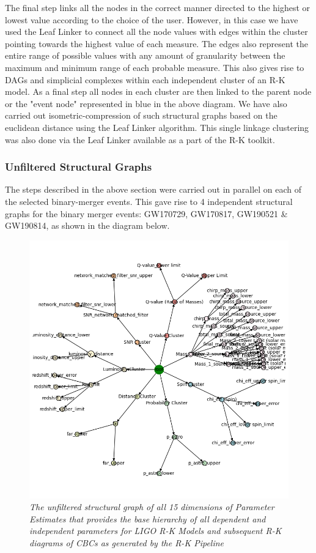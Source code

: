 The final step links all the nodes in the correct manner directed to the highest or lowest value according to the choice of the user. However, in this case we have used the Leaf Linker to connect all the node values with edges within the cluster pointing towards the highest value of each measure. The edges also represent the entire range of possible values with any amount of granularity between the maximum and minimum range of each probable measure. This also gives rise to DAGs and simplicial complexes within each independent cluster of an R-K model. As a final step all nodes in each cluster are then linked to the parent node or the "event node" represented in blue in the above diagram. We have also carried out isometric-compression of such structural graphs based on the euclidean distance using the Leaf Linker algorithm. This single linkage clustering was also done via the Leaf Linker available as a part of the R-K toolkit.

\subsubsection{Unfiltered Structural Graphs}


The steps described in the above section were carried out in parallel on each of the selected binary-merger events. This gave rise to 4 independent structural graphs for the binary merger events:  GW170729, GW170817, GW190521 \& GW190814, as shown in the diagram below.

    \begin{figure}[H]
        \centering
        \includegraphics[width=1.0\linewidth]{images/ligo_structural_graph.png}
        \caption{\textit{The unfiltered structural graph of all 15 dimensions of Parameter Estimates that provides the base hierarchy  of all dependent and independent parameters for LIGO R-K Models and subsequent R-K diagrams of CBCs as generated by the R-K Pipeline}}
        \label{fig:LIGO12_PlaceHolder_fig}
    \end{figure}
    
